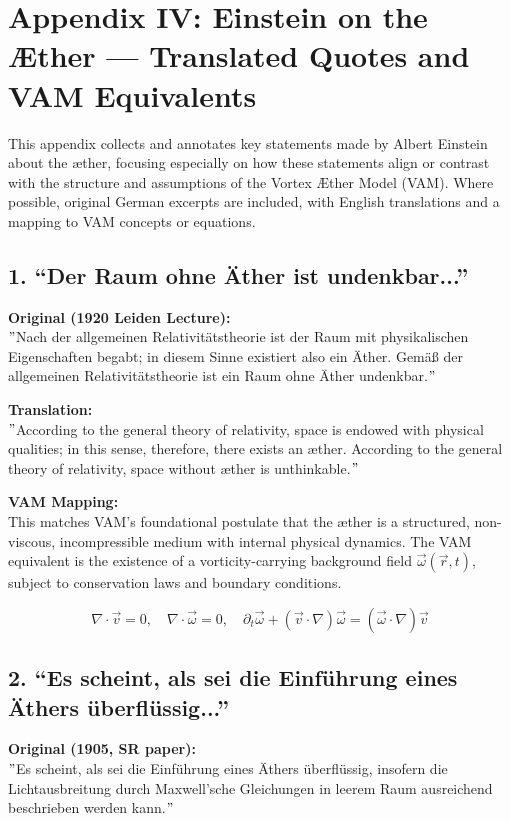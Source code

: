\documentclass[preprint,notitlepage]{revtex4-2}
\renewcommand{\grqq}{``}
\begin{document}
\section*{Appendix IV: Einstein on the Æther — Translated Quotes and VAM Equivalents}
\label{appendix:einstein}

    This appendix collects and annotates key statements made by Albert Einstein about the æther, focusing especially on how these statements align or contrast with the structure and assumptions of the Vortex Æther Model (VAM). Where possible, original German excerpts are included, with English translations and a mapping to VAM concepts or equations.

    \subsection*{1. \grqq Der Raum ohne Äther ist undenkbar...\textquotedblright}
    \textbf{Original (1920 Leiden Lecture):} \\
    \("\)Nach der allgemeinen Relativitätstheorie ist der Raum mit physikalischen Eigenschaften begabt; in diesem Sinne existiert also ein Äther. Gemäß der allgemeinen Relativitätstheorie ist ein Raum ohne Äther undenkbar.\("\)

    \textbf{Translation:} \\
    \("\)According to the general theory of relativity, space is endowed with physical qualities; in this sense, therefore, there exists an æther. According to the general theory of relativity, space without æther is unthinkable.\("\)

    \textbf{VAM Mapping:} \\
    This matches VAM's foundational postulate that the æther is a structured, non-viscous, incompressible medium with internal physical dynamics. The VAM equivalent is the existence of a vorticity-carrying background field \( \vec{\omega}(\vec{r}, t) \), subject to conservation laws and boundary conditions.

    \[
    \nabla \cdot \vec{v} = 0, \quad \nabla \cdot \vec{\omega} = 0, \quad \partial_t \vec{\omega} + (\vec{v} \cdot \nabla) \vec{\omega} = (\vec{\omega} \cdot \nabla) \vec{v}
    \]

    \subsection*{2. \grqq Es scheint, als sei die Einführung eines Äthers überflüssig...\textquotedblright}
    \textbf{Original (1905, SR paper):} \\
    \("\)Es scheint, als sei die Einführung eines Äthers überflüssig, insofern die Lichtausbreitung durch Maxwell'sche Gleichungen in leerem Raum ausreichend beschrieben werden kann.\("\)
\end{document}
